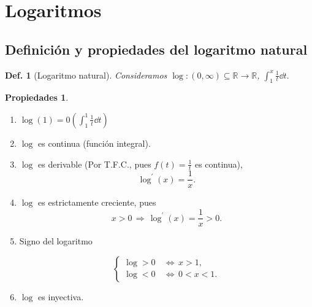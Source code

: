 \documentclass{article}
\theoremstyle{definicion}
\newtheorem{definicion}{Def.}
\theoremstyle{definition}             %
\theoremstyle{definition}             %
\theoremstyle{definition}
\theoremstyle{definition}
\newtheorem{properties}{Propiedades}
\theoremstyle{observacion}
\theoremstyle{definition}
\theoremstyle{plain}
\theoremstyle{definition}
\theoremstyle{afirmacion}
\theoremstyle{definition}
\begin{document}
    \section{Logaritmos}
    \subsection{Definición y propiedades del logaritmo natural}

    \begin{definicion}[Logaritmo natural]   
        Consideramos \(\log \colon (0, \infty) \subseteq \mathbb{R} \to \mathbb{R}\), \(\int_{1}^{x}\frac{1}{t}\dd{t}.\)
    \end{definicion}

    \begin{properties}
        \vphantom{adfslfjsdlfjdslajfakjfkdlsjfakjfljdaskfjlasdjflkasjfdkajd}
        \begin{enumerate}[label = \roman*)]
            \item \(\log(1) = 0 (\int_{1}^{1}\frac{1}{t}\dd{t})\)
            \item \(\log\) es continua (función integral).
            \item \(\log\) es derivable (Por T.F.C., pues \(f(t) = \frac{1}{t}\) es continua),
                \begin{equation*}
                    \log^{\prime}(x) = \dfrac{1}{x}.        
                \end{equation*}
            \item \(\log\) es estrictamente creciente, pues 
                \begin{equation*}
                    x > 0\, \Rightarrow\, \log^{\prime}(x) = \dfrac{1}{x} > 0.
                \end{equation*}
            
            \item Signo del logaritmo 
            
                \begin{equation*}
                    \begin{cases}
                        \log > 0\, &\Leftrightarrow\, x > 1,\\
                        \log < 0\, &\Leftrightarrow\, 0 < x < 1.
                    \end{cases}
                \end{equation*}

            \item \(\log\) es inyectiva.
        \end{enumerate}
    \end{properties}
\end{document}
